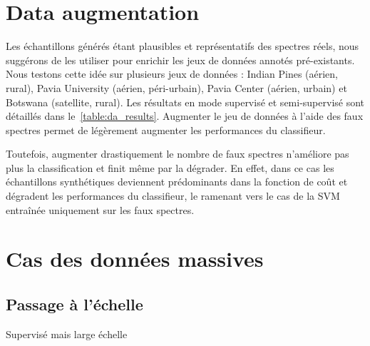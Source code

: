 \section{Data augmentation}
\label{sec:augmentation}

Les échantillons générés étant plausibles et représentatifs des spectres réels, nous suggérons de les utiliser pour enrichir les jeux de données annotés pré-existants. Nous testons cette idée sur plusieurs jeux de données : Indian Pines (aérien, rural), Pavia University (aérien, péri-urbain), Pavia Center (aérien, urbain) et Botswana (satellite, rural). Les résultats en mode supervisé et semi-supervisé sont détaillés dans le~\cref{table:da_results}. Augmenter le jeu de données à l'aide des faux spectres permet de légèrement augmenter les performances du classifieur.

Toutefois, augmenter drastiquement le nombre de faux spectres n'améliore pas plus la classification et finit même par la dégrader. En effet, dans ce cas les échantillons synthétiques deviennent prédominants dans la fonction de coût et dégradent les performances du classifieur, le ramenant vers le cas de la \gls{SVM} entraînée uniquement sur les faux spectres.

\section{Cas des données massives}

\subsection{Passage à l'échelle}

Supervisé mais large échelle





